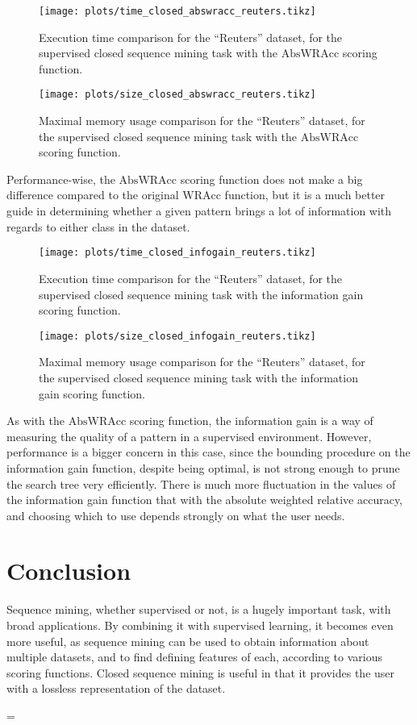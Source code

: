 \documentclass{sigkddExp}
\newcommand{\wracc}{\mathrm{WRAcc}}
\newcommand{\abswracc}{\mathrm{AbsWRAcc}}
\newenvironment{absolutelynopagebreak}
{\par\nobreak\vfil\penalty0\vfilneg
	\vtop\bgroup}
{\par\xdef\tpd{\the\prevdepth}\egroup
	\prevdepth=\tpd}
\begin{document}
\begin{figure}[!hbtp]
	\centering
	\texttt{[image: plots/time\_closed\_abswracc\_reuters.tikz]}
	\caption{Execution time comparison for the ``Reuters'' dataset, for the supervised closed sequence mining task with the \(\abswracc\) scoring function.}
	\label{fig:time_closed_abswracc_reuters}
\end{figure}%
\begin{figure}[!hbtp]
	\centering
	\texttt{[image: plots/size\_closed\_abswracc\_reuters.tikz]}
	\caption{Maximal memory usage comparison for the ``Reuters'' dataset, for the supervised closed sequence mining task with the \(\abswracc\) scoring function.}
	\label{fig:size_closed_abswracc_reuters}
\end{figure}
Performance-wise, the \(\abswracc\) scoring function does not make a big difference compared to the original \(\wracc\) function, but it is a much better guide in determining whether a given pattern brings a lot of information with regards to either class in the dataset.

\begin{figure}[H]
	\centering
	\texttt{[image: plots/time\_closed\_infogain\_reuters.tikz]}
	\caption{Execution time comparison for the ``Reuters'' dataset, for the supervised closed sequence mining task with the information gain scoring function.}
	\label{fig:time_closed_infogain_reuters}
\end{figure}
\begin{absolutelynopagebreak}
\begin{figure}[H]
	\centering
	\texttt{[image: plots/size\_closed\_infogain\_reuters.tikz]}
	\caption{Maximal memory usage comparison for the ``Reuters'' dataset, for the supervised closed sequence mining task with the information gain scoring function.}
	\label{fig:size_closed_infogain_reuters}
\end{figure}

As with the \(\abswracc\) scoring function, the information gain is a way of measuring the quality of a pattern in a supervised environment.
However, performance is a bigger concern in this case, since the bounding procedure on the information gain function, despite being optimal, is not strong enough to prune the search tree very efficiently.
There is much more fluctuation in the values of the information gain function that with the absolute weighted relative accuracy, and choosing which to use depends strongly on what the user needs.

\section{Conclusion}
Sequence mining, whether supervised or not, is a hugely important task, with broad applications.
By combining it with supervised learning, it becomes even more useful, as sequence mining can be used to obtain information about multiple datasets, and to find defining features of each, according to various scoring functions.
Closed sequence mining is useful in that it provides the user with a lossless representation of the dataset.
\end{absolutelynopagebreak}
\end{document}
